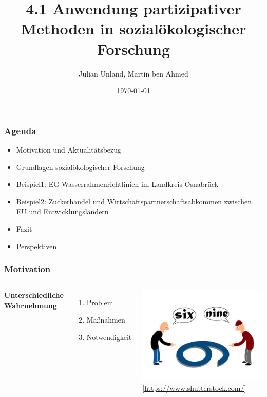 \documentclass{beamer}
\title[4.1 Partizipative Methoden]{4.1 Anwendung partizipativer Methoden in sozialökologischer Forschung} %
\author{Julian Unland, Martin ben Ahmed} %
\institute[UOS] %
{
Universität Osnabrück \\ %
\medskip
\textit{junland@uos.de} %
\textit{mbenahmed@uos.de} %
}
\date{\today} %
\begin{document}
\begin{frame}
\titlepage %
\end{frame}





\begin{frame}
\frametitle{Agenda}
\begin{itemize}
\item Motivation und Aktualitätsbezug
\item Grundlagen sozialökologischer Forschung
\item Beispiel1: EG-Wasserrahmenrichtlinien im Landkreis Osnabrück
\item Beispiel2: Zuckerhandel und Wirtschaftspartnerschaftsabkommen zwischen EU und Entwicklungsländern
\item Fazit
\item Perspektiven
\end{itemize}
\end{frame}



\begin{frame}
\frametitle{Motivation}
\begin{columns}[c] %

\textbf{Unterschiedliche Wahrnehmung}
\begin{enumerate}
\item Problem
\item Maßnahmen
\item Notwendigkeit
\end{enumerate}

\includegraphics[scale=0.35]{perspective.png}
\tiny [\url{https://www.shutterstock.com/}]

\end{columns}
\end{frame}
\end{document}
